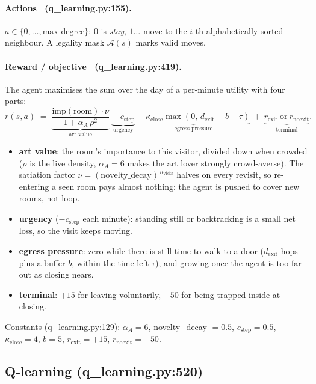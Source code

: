 \documentclass[11pt]{article}
\newcommand{\Acal}{\mathcal{A}}
\begin{document}
\paragraph{Actions \ (q\_learning.py:155).}
$a\in\{0,\dots,\text{max\_degree}\}$: $0$ is \emph{stay}, $1\dots$ move to the $i$-th
alphabetically-sorted neighbour. A legality mask $\Acal(s)$ marks valid moves.

\paragraph{Reward / objective \ (q\_learning.py:419).} The agent maximises the sum over
the day of a per-minute utility with four parts:
\[
r(s,a)\;=\;\underbrace{\frac{\mathrm{imp}(\text{room})\cdot \nu}{\,1+\alpha_A\,\rho^2\,}}_{\text{art value}}\ \underbrace{-\;c_{\text{step}}}_{\text{urgency}}\ \underbrace{-\;\kappa_{\text{close}}\max(0,\,d_{\text{exit}}+b-\tau)}_{\text{egress pressure}}\ +\ \underbrace{r_{\text{exit}}\ \text{or}\ r_{\text{noexit}}}_{\text{terminal}}.
\]
\begin{itemize}
\item \textbf{art value}: the room's importance to this visitor, divided down when crowded ($\rho$ is the live density, $\alpha_A=6$ makes the art lover strongly crowd-averse). The satiation factor $\nu=(\text{novelty\_decay})^{\,n_{\text{visits}}}$ halves on every revisit, so re-entering a seen room pays almost nothing: the agent is pushed to cover new rooms, not loop.
\item \textbf{urgency} ($-c_{\text{step}}$ each minute): standing still or backtracking is a small net loss, so the visit keeps moving.
\item \textbf{egress pressure}: zero while there is still time to walk to a door ($d_{\text{exit}}$ hops plus a buffer $b$, within the time left $\tau$), and growing once the agent is too far out as closing nears.
\item \textbf{terminal}: $+15$ for leaving voluntarily, $-50$ for being trapped inside at closing.
\end{itemize}
Constants (q\_learning.py:129): $\alpha_A=6$, novelty\_decay $=0.5$, $c_{\text{step}}=0.5$,
$\kappa_{\text{close}}=4$, $b=5$, $r_{\text{exit}}=+15$, $r_{\text{noexit}}=-50$.

\subsection{Q-learning (q\_learning.py:520)}
\end{document}
